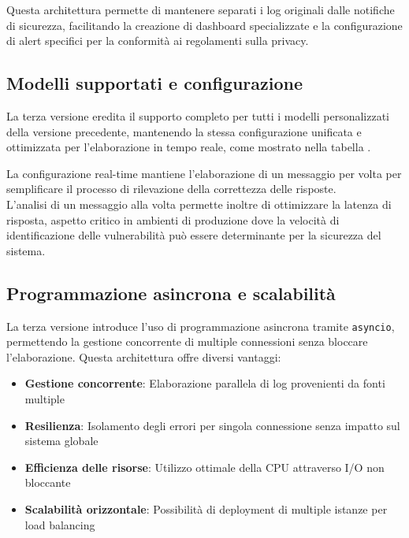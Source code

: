 \documentclass[12pt]{report}
\begin{document}
Questa architettura permette di mantenere separati i log originali dalle notifiche di sicurezza, facilitando la creazione di dashboard specializzate e la configurazione di alert specifici per la conformità ai regolamenti sulla privacy.

\subsection{Modelli supportati e configurazione}
\label{subsec:ver3_modelli_supportati}

La terza versione eredita il supporto completo per tutti i modelli personalizzati della versione precedente, mantenendo la stessa configurazione unificata e ottimizzata per l'elaborazione in tempo reale, come mostrato nella tabella .

La configurazione real-time mantiene l'elaborazione di un messaggio per volta per semplificare il processo di rilevazione della correttezza delle risposte. \\
L'analisi di un messaggio alla volta permette inoltre di ottimizzare la latenza di risposta, aspetto critico in ambienti di produzione dove la velocità di identificazione delle vulnerabilità può essere determinante per la sicurezza del sistema.

\subsection{Programmazione asincrona e scalabilità}
\label{subsec:ver3_asincrona}

La terza versione introduce l'uso di programmazione asincrona tramite \texttt{asyncio}, permettendo la gestione concorrente di multiple connessioni senza bloccare l'elaborazione. Questa architettura offre diversi vantaggi:

\begin{itemize}
    \item \textbf{Gestione concorrente}: Elaborazione parallela di log provenienti da fonti multiple
    \item \textbf{Resilienza}: Isolamento degli errori per singola connessione senza impatto sul sistema globale
    \item \textbf{Efficienza delle risorse}: Utilizzo ottimale della CPU attraverso I/O non bloccante
    \item \textbf{Scalabilità orizzontale}: Possibilità di deployment di multiple istanze per load balancing
\end{itemize}
\end{document}
